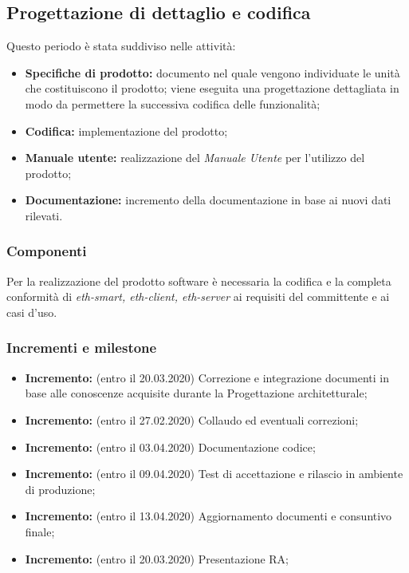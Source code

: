 \subsection{Progettazione di dettaglio e codifica}

\noindent Questo periodo è stata suddiviso nelle attività:
\begin{itemize}
	\item \textbf{Specifiche di prodotto:} documento nel quale vengono individuate le unità che costituiscono il prodotto; viene eseguita una progettazione dettagliata in modo da permettere la successiva codifica delle funzionalità;
	\item  \textbf{Codifica:} implementazione del prodotto;
	\item \textbf{Manuale utente:} realizzazione del \textit{Manuale Utente} per l'utilizzo del prodotto;
	\item \textbf{Documentazione:} incremento della documentazione in base ai nuovi dati rilevati.
\end{itemize}
\subsubsection{Componenti}
Per la realizzazione del prodotto software è necessaria la codifica e la completa conformità di \textit{eth-smart, eth-client, eth-server} ai requisiti del committente e ai casi d'uso.
\subsubsection{Incrementi e milestone}
\begin{itemize}
	\item \textbf{ Incremento:} (entro il 20.03.2020) Correzione e integrazione documenti in base alle conoscenze acquisite durante la Progettazione architetturale;
	\item \textbf{ Incremento:} (entro il 27.02.2020) Collaudo ed eventuali correzioni;
	\item \textbf{ Incremento:} (entro il 03.04.2020) Documentazione codice;
	\item \textbf{ Incremento:} (entro il 09.04.2020) Test di accettazione e rilascio in ambiente di produzione;
	\item \textbf{ Incremento:} (entro il 13.04.2020) Aggiornamento documenti e consuntivo finale;
	\item \textbf{ Incremento:} (entro il 20.03.2020) Presentazione RA;
\end{itemize}

